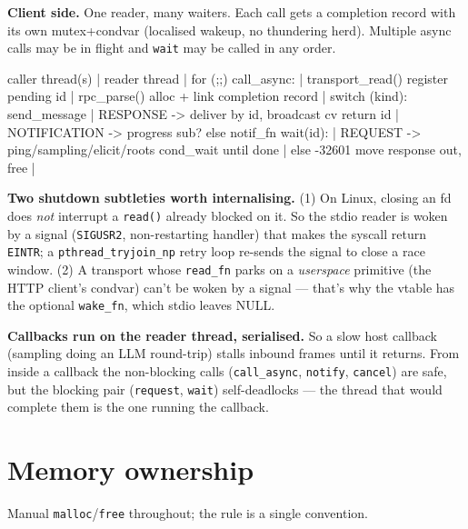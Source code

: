\documentclass[10pt]{article}
\newcommand{\code}[1]{\texttt{\small #1}}
\begin{document}
\textbf{Client side.} One reader, many waiters. Each call gets a completion record
with its own mutex+condvar (localised wakeup, no thundering herd). Multiple async
calls may be in flight and \code{wait} may be called in any order.

\begin{diag}
  caller thread(s)                   |  reader thread
                                     |  for (;;) {
  call_async:                        |     transport_read()
    register pending id              |     rpc_parse()
    alloc + link completion record   |     switch (kind):
    send_message                     |       RESPONSE -> deliver by id, broadcast cv
    return id                        |       NOTIFICATION -> progress sub? else notif_fn
  wait(id):                          |       REQUEST -> ping/sampling/elicit/roots
    cond_wait until done             |                  else -32601
    move response out, free          |  }
\end{diag}

\textbf{Two shutdown subtleties worth internalising.} (1) On Linux, closing an fd
does \emph{not} interrupt a \code{read()} already blocked on it. So the stdio
reader is woken by a signal (\code{SIGUSR2}, non-restarting handler) that makes
the syscall return \code{EINTR}; a \code{pthread\_tryjoin\_np} retry loop
re-sends the signal to close a race window. (2) A transport whose \code{read\_fn}
parks on a \emph{userspace} primitive (the HTTP client's condvar) can't be woken
by a signal --- that's why the vtable has the optional \code{wake\_fn}, which
stdio leaves NULL.

\textbf{Callbacks run on the reader thread, serialised.} So a slow host callback
(sampling doing an LLM round-trip) stalls inbound frames until it returns. From
inside a callback the non-blocking calls (\code{call\_async}, \code{notify},
\code{cancel}) are safe, but the blocking pair (\code{request}, \code{wait})
self-deadlocks --- the thread that would complete them is the one running the
callback.

\section{Memory ownership}

Manual \code{malloc}/\code{free} throughout; the rule is a single convention.
\end{document}
